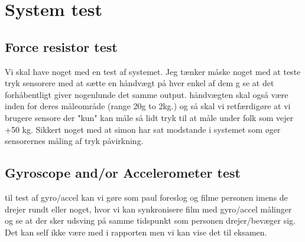\section{System test}

\subsection{Force resistor test}
Vi skal have noget med en test af systemet. Jeg tænker måske noget med at teste tryk sensorere med at sætte en håndvægt på hver enkel af dem g se at det forhåbentligt giver nogenlunde det samme output. håndvægten skal også være inden for deres måleområde (range 20g to 2kg.) og så skal vi retfærdigøre at vi brugere sensore der "kun" kan måle så lidt tryk til at måle under folk som vejer +50 kg. Sikkert noget med at simon har sat modstande i systemet som øger sensorernes måling af tryk påvirkning. 


\subsection{Gyroscope and/or Accelerometer test}
til test af gyro/accel kan vi gøre som paul foreslog og filme personen imens de drejer rundt eller noget, hvor vi kan synkronisere film med gyro/accel målinger og se at der sker udsving på samme tidspunkt som personen drejer/bevæger sig. Det kan self ikke være med i rapporten men vi kan vise det til eksamen. 
